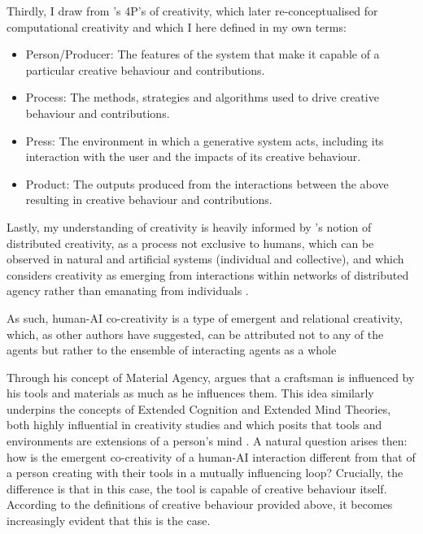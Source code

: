Thirdly, I draw from \citeauthor{Rhodes1961-od}'s \citep{Rhodes1961-od} 4P's of creativity, which \citet{Jordanous2016-xb} later re-conceptualised for computational creativity and which I here defined in my own terms: 

\begin{itemize}
    \item Person/Producer: The features of the system that make it capable of a particular creative behaviour and contributions.
    \item Process: The methods, strategies and algorithms used to drive creative behaviour and contributions.
    \item Press: The environment in which a generative system acts, including its interaction with the user and the impacts of its creative behaviour.
    \item Product: The outputs produced from the interactions between the above resulting in creative behaviour and contributions.
\end{itemize}

Lastly, my understanding of creativity is heavily informed by \citeauthor{Bown2012-gg}'s notion of distributed creativity, as a process not exclusive to humans, which can be observed in natural and artificial systems (individual and collective), and which considers creativity as emerging from interactions within networks of distributed agency rather than emanating from individuals \citep{Bown2012-gg, Bown2021-os}. 

As such, human-AI co-creativity is a type of emergent and relational creativity, which, as other authors have suggested, can be attributed not to any of the agents but rather to the ensemble of interacting agents as a whole \citep{Davis2013-jy, Rezwana2023-rt}

Through his concept of Material Agency, \citet{Malafouris2013-by} argues that a craftsman is influenced by his tools and materials as much as he influences them. This idea similarly underpins the concepts of Extended Cognition and Extended Mind Theories, both highly influential in creativity studies and which posits that tools and environments are extensions of a person's mind \citep{Clark1998-yi}. A natural question arises then: how is the emergent co-creativity of a human-AI interaction different from that of a person creating with their tools in a mutually influencing loop? Crucially, the difference is that in this case, the tool is capable of creative behaviour itself. According to the definitions of creative behaviour provided above, it becomes increasingly evident that this is the case. 

